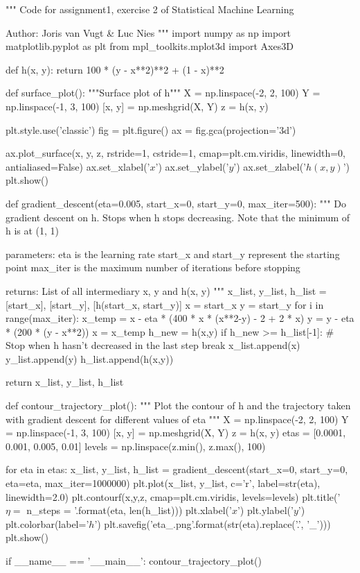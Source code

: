 \documentclass{article}
\begin{document}
\begin{python}
"""
Code for assignment1, exercise 2 of Statistical Machine Learning

Author: Joris van Vugt & Luc Nies
"""
import numpy as np
import matplotlib.pyplot as plt
from mpl_toolkits.mplot3d import Axes3D

def h(x, y):
    return 100 * (y - x**2)**2 + (1 - x)**2

def surface_plot():
    """Surface plot of h"""
    X = np.linspace(-2, 2, 100)
    Y = np.linspace(-1, 3, 100)
    [x, y] = np.meshgrid(X, Y)
    z = h(x, y)

    plt.style.use('classic')
    fig = plt.figure()
    ax = fig.gca(projection='3d')

    ax.plot_surface(x, y, z, rstride=1, cstride=1, cmap=plt.cm.viridis, linewidth=0, antialiased=False)
    ax.set_xlabel('$x$')
    ax.set_ylabel('$y$')
    ax.set_zlabel('$h(x, y)$')
    plt.show()

def gradient_descent(eta=0.005, start_x=0, start_y=0, max_iter=500):
    """
    Do gradient descent on h. Stops when h stops decreasing.
    Note that the minimum of h is at (1, 1)

    parameters:
    eta is the learning rate
    start_x and start_y represent the starting point
    max_iter is the maximum number of iterations before stopping

    returns:
    List of all intermediary x, y and h(x, y)
    """
    x_list, y_list, h_list  = [start_x], [start_y], [h(start_x, start_y)]
    x = start_x
    y = start_y
    for i in range(max_iter):
        x_temp = x - eta * (400 * x * (x**2-y) - 2 + 2 * x)
        y = y - eta * (200 * (y - x**2))
        x = x_temp
        h_new = h(x,y)
        if h_new >= h_list[-1]:
            # Stop when h hasn't decreased in the last step
            break
        x_list.append(x)
        y_list.append(y)
        h_list.append(h(x,y))

    return x_list, y_list, h_list

def contour_trajectory_plot():
    """
    Plot the contour of h and the trajectory
    taken with gradient descent for different values of eta
    """
    X = np.linspace(-2, 2, 100)
    Y = np.linspace(-1, 3, 100)
    [x, y] = np.meshgrid(X, Y)
    z = h(x, y)
    etas = [0.0001, 0.001, 0.005, 0.01]
    levels = np.linspace(z.min(), z.max(), 100)

    for eta in etas:
        x_list, y_list, h_list = gradient_descent(start_x=0, start_y=0, eta=eta, max_iter=1000000)
        plt.plot(x_list, y_list, c='r', label=str(eta), linewidth=2.0)
        plt.contourf(x,y,z, cmap=plt.cm.viridis, levels=levels)
        plt.title('$\eta = {}$ n_steps = {}'.format(eta, len(h_list)))
        plt.xlabel('$x$')
        plt.ylabel('$y$')
        plt.colorbar(label='$h$')
        plt.savefig('eta_{}.png'.format(str(eta).replace('.', '_')))
        plt.show()


if __name__ == '__main__':
    contour_trajectory_plot()

\end{python}
\end{document}
